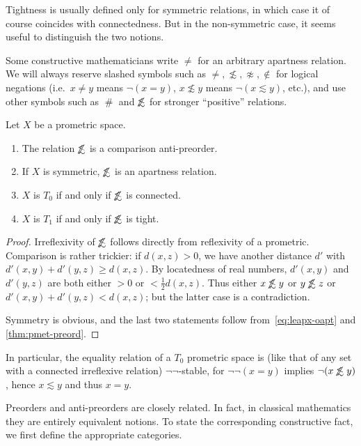 \documentclass{article}
\def\apart{\mathrel{\#}}
\def\napprox{\not\approx}
\def\oapt{\mathrel{\!\not\,\not\lesssim}}
\def\leapx{\lesssim}
\def\nn{\ensuremath{\neg\neg}}
\begin{document}
Tightness is usually defined only for symmetric relations, in which case it of course coincides with connectedness.
But in the non-symmetric case, it seems useful to distinguish the two notions.

\begin{warn}
  Some constructive mathematicians write $\neq$ for an arbitrary apartness relation.
  We will always reserve slashed symbols such as $\neq,\not\leapx,\napprox,\notin$ for logical negations (i.e.\ $x\neq y$ means $\neg(x=y)$, $x\not\leapx y$ means $\neg(x\leapx y)$, etc.), and use other symbols such as $\apart$ and $\oapt$ for stronger ``positive'' relations.
\end{warn}

\begin{thm}
  Let $X$ be a prometric space.
  \begin{enumerate}
  \item The relation $\oapt$ is a comparison anti-preorder.  
  \item If $X$ is symmetric, $\oapt$ is an apartness relation.
  \item $X$ is $T_0$ if and only if $\oapt$ is connected.
  \item $X$ is $T_1$ if and only if $\oapt$ is tight.
  \end{enumerate}
\end{thm}
\begin{proof}
  Irreflexivity of $\oapt $ follows directly from reflexivity of a prometric.
  Comparison is rather trickier: if $d(x,z)>0$, we have another distance $d'$ with $d'(x,y)+d'(y,z)\ge d(x,z)$.
  By locatedness of real numbers, $d'(x,y)$ and $d'(y,z)$ are both either $>0$ or $<\frac12 d(x,z)$.
  Thus either $x\oapt y$ or $y\oapt z$ or $d'(x,y)+d'(y,z) < d(x,z)$; but the latter case is a contradiction.

  Symmetry is obvious, and the last two statements follow from~\eqref{eq:leapx-oapt} and \cref{thm:pmet-preord}.
\end{proof}

In particular, the equality relation of a $T_0$ prometric space is (like that of any set with a connected irreflexive relation) \nn-stable, for $\neg\neg(x=y)$ implies $\neg(x\oapt y)$, hence $x\leapx y$ and thus $x=y$.

Preorders and anti-preorders are closely related.
In fact, in classical mathematics they are entirely equivalent notions.
To state the corresponding constructive fact, we first define the appropriate categories.
\end{document}
